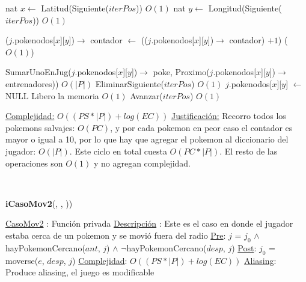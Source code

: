 \begin{Algoritmos}
\begin{algorithmic}[1]
  \State nat $x \gets$ Latitud(Siguiente($iterPos$)) \Comment $O(1)$
  \State nat $y \gets$ Longitud(Siguiente($iterPos$)) \Comment $O(1)$   
  
    \State ($j$.pokenodos[$x$][$y$])$\rightarrow$ contador $\gets$ (($j$.pokenodos[$x$][$y$])$\rightarrow$ contador) $+ 1$) \Comment($O(1)$)
  \EndIf
  
    \State SumarUnoEnJug($j$.pokenodos[$x$][$y$])$\rightarrow$ poke, Proximo($j$.pokenodos[$x$][$y$])$\rightarrow$ entrenadores)) \Comment $O(|P|)$
    \State EliminarSiguiente($iterPos$) \Comment $O(1)$
    \State $j$.pokenodos[$x$][$y$] $\gets$ NULL \Comment Libero la memoria $O(1)$
  \Else 
    \State Avanzar($iterPos$) \Comment $O(1)$ 
  \EndIf

\EndWhile 

\medskip
\Statex \underline{Complejidad:} $O((PS *|P|) + log(EC))$ 
\Statex \underline{Justificaci\'on:} Recorro todos los pokemons salvajes: $O(PC)$, y por cada pokemon en peor caso el contador es mayor o igual a 10, por lo que hay que agregar el pokemon al diccionario del jugador: $O(|P|)$. Este ciclo en total cuesta $O(PC*|P|)$. El resto de las operaciones son $O(1)$ y no agregan complejidad. 
\end{algorithmic}

$ $\newline
$ $\newline


{\textbf{iCasoMov2}(,  , ))}
\begin{algorithmic}[1]

\Statex \underline{CasoMov2} : Funci\'on privada 
\Statex \underline{Descripci\'on} : Este es el caso en donde el jugador estaba cerca de un pokemon y se movi\'o fuera del radio
\Statex \underline{Pre}: $j$ = $j_0$ $\land$ hayPokemonCercano($ant$, $j$) $\land$ $\neg$hayPokemonCercano($desp$, $j$) 
\Statex \underline{Post}: $j_0$ = moverse($e$, $desp$, $j$) 
\Statex \underline{Complejidad}:  $O((PS *|P|) + log(EC))$ 
\Statex \underline{Aliasing}: Produce aliasing, el juego es modificable

$ $\newline


\end{algorithmic}
\end{Algoritmos}
